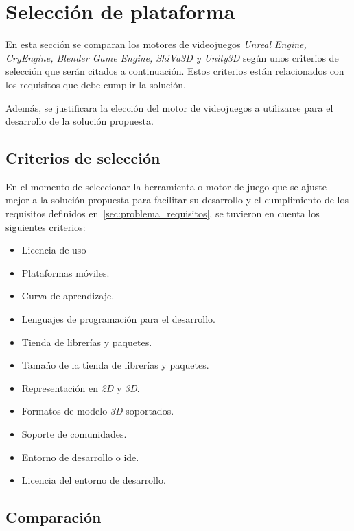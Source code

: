 \section{Selección de plataforma}
\label{sec:seleccion_plataforma}

En esta sección se comparan los motores de videojuegos \textit{Unreal Engine,
    CryEngine, Blender Game Engine, ShiVa3D y Unity3D} según unos criterios de
selección que serán citados a continuación. Estos criterios están relacionados
con los requisitos que debe cumplir la solución.

Además, se justificara la elección del motor de videojuegos a utilizarse para el desarrollo de la solución propuesta.

\subsection{Criterios de selección}

En el momento de seleccionar la herramienta o motor de juego que se ajuste mejor
a la solución propuesta para facilitar su desarrollo y el cumplimiento de los
requisitos definidos en~\ref{sec:problema_requisitos}, se tuvieron en cuenta los
siguientes criterios:


\begin{itemize}
\item Licencia de uso
\item Plataformas móviles.
\item Curva de aprendizaje.
\item Lenguajes de programación para el desarrollo.
\item Tienda de librerías y paquetes.
\item Tamaño de la tienda de librerías y paquetes.
\item Representación en \textit{2D} y \textit{3D}.
\item Formatos de modelo \textit{3D} soportados.
\item Soporte de comunidades.
\item Entorno de desarrollo o \Gls{ide}.
\item Licencia del entorno de desarrollo.
\end{itemize}


\subsection{Comparación}

